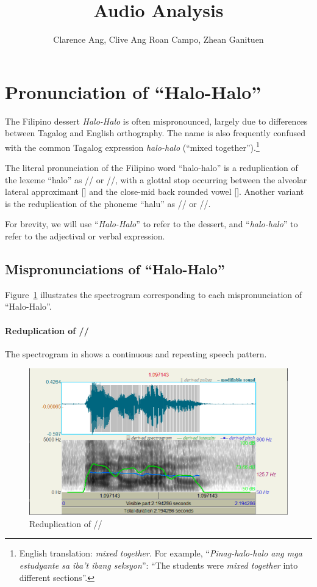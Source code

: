 \documentclass{article}
\title{Audio Analysis}
\author{   
    Clarence Ang,
    Clive Ang
    Roan Campo,
    Zhean Ganituen
}
\begin{document}
\maketitle

\section{Pronunciation of ``Halo-Halo''}

The Filipino dessert \emph{Halo-Halo} is often mispronounced, largely due to
differences between Tagalog and English orthography. The name is also
frequently confused with the common Tagalog expression \emph{halo-halo}
(``mixed together'').\footnote{English translation: \emph{mixed together}. For
    example, ``\emph{Pinag-halo-halo ang mga estudyante sa iba't ibang seksyon}'':
    ``The students were \emph{mixed together} into different sections''.}

The literal pronunciation of the Filipino word ``halo-halo'' is a reduplication
of the lexeme ``halo'' as // or //, with a glottal
stop occurring between the alveolar lateral approximant [] and the
close-mid back rounded vowel []. Another variant is the
reduplication of the phoneme ``halu'' as // or //.

For brevity, we will use ``\emph{Halo-Halo}'' to refer to the dessert, and
``\emph{halo-halo}'' to refer to the adjectival or verbal expression.

\subsection{Mispronunciations of ``Halo-Halo''}

Figure~\ref{fig:halo} illustrates the spectrogram corresponding to each
mispronunciation of ``Halo-Halo''.

\paragraph{Reduplication of //} The spectrogram in
 shows a continuous and repeating speech pattern.

\begin{figure}
    \centering
    \includegraphics[width=0.65\linewidth]{img/halo.png}
    \caption{Reduplication of //}\label{fig:halo}
\end{figure}
\end{document}
